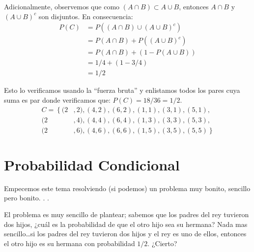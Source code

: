 \documentclass[14pt]{extreport}
\theoremstyle{definicion}
\theoremstyle{propiedad}
\begin{document}
Adicionalmente, observemos que como $(A \cap B) \subset A \cup B$, entonces $A \cap B$ y $(A
  \cup B)^c$ son disjuntos. En consecuencia:
\begin{equation*}
  \begin{split}
    P(C ) & = P((A \cap B) \cup (A \cup B)^c ) \\
    & = P(A \cap B) + P((A \cup B)^c )    \\
    & = P(A \cap B) + (1 - P(A \cup B)) \\
    & = 1/4 + (1-3/4)\\
    & = 1/2
  \end{split}
\end{equation*}

Esto lo verificamos usando la ``fuerza bruta'' y enlistamos todos los pares cuya suma es par donde verificamos que: $P(C ) = 18/36 = 1/2$.
\begin{equation*}
  \begin{split}
    C = \left\{\right. (2&, 2), (4, 2), (6, 2),(1, 1), (3, 1), (5, 1),\\
    (2&, 4), (4, 4), (6, 4),(1, 3), (3, 3), (5, 3),\\
    (2&, 6), (4, 6), (6, 6),(1, 5), (3, 5), (5, 5)\left.\right\}
  \end{split}
\end{equation*}
\chapter{Probabilidad Condicional}
Empecemos este tema resolviendo (si podemos) un problema muy bonito, sencillo pero bonito. . .

El problema es muy sencillo de plantear; sabemos que los padres del rey tuvieron dos hijos, ¿cuál es la probabilidad de que el otro hijo sea su hermana? Nada mas sencillo\ldots si los padres del rey tuvieron dos hijos y el rey es uno de ellos, entonces el otro hijo es su hermana con probabilidad $1/2$. ¿Cierto?
\end{document}
